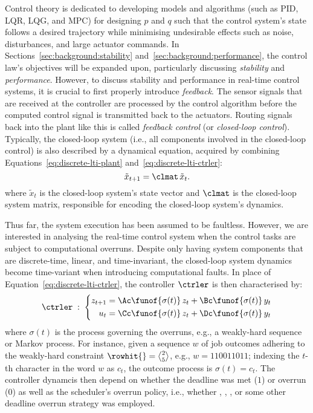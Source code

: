 Control theory is dedicated to developing models and algorithms (such as PID, LQR, LQG, and MPC) for designing $p$ and $q$ such that the control system's state follows a desired trajectory while minimising undesirable effects such as noise, disturbances, and large actuator commands.
In Sections~\ref{sec:background:stability} and~\ref{sec:background:performance}, the control law's objectives will be expanded upon, particularly discussing \emph{stability}  and \emph{performance}.
However, to discuss stability and performance in real-time control systems, it is crucial to first properly introduce \emph{feedback}.
The sensor signals that are received at the controller are processed by the control algorithm before the computed control signal is transmitted back to the actuators.
Routing signals back into the plant like this is called \emph{feedback control} (or \emph{closed-loop control}).
Typically, the closed-loop system (i.e., all components involved in the closed-loop control) is also described by a dynamical equation, acquired by combining Equations~\eqref{eq:discrete-lti-plant} and~\eqref{eq:discrete-lti-ctrler}:
%
\begin{equation}%
    \label{eq:clsys}%
    \tilde{x}_{t+1} = \clmat\, \tilde{x}_t.
\end{equation}
%
where $\tilde{x}_t$ is the closed-loop system's state vector and $\clmat$ is the closed-loop system matrix, responsible for encoding the closed-loop system's dynamics.

Thus far, the system execution has been assumed to be faultless.
However, we are interested in analysing the real-time control system when the control tasks are subject to computational overruns.
Despite only having system components that are discrete-time, linear, and time-invariant, the closed-loop system dynamics become time-variant when introducing computational faults.
In place of Equation~\eqref{eq:discrete-lti-ctrler}, the controller $\ctrler$ is then characterised by:
%
\begin{equation}%
    \label{eq:tv-ctrler}%
    \ctrler \; : \; \left\{\begin{aligned}
        z_{t+1} &= \Ac\funof{\sigma(t)}\,z_t + \Bc\funof{\sigma(t)}\,y_t \\
        u_t &= \Cc\funof{\sigma(t)}\,z_t + \Dc\funof{\sigma(t)}\,y_t \\
    \end{aligned}\right.
\end{equation}
%
where $\sigma(t)$ is the process governing the overruns, e.g., a weakly-hard sequence or Markov process.
For instance, given a sequence $w$ of job outcomes adhering to the weakly-hard constraint $\rowhit{} = \genfrac{<}{>}{0pt}{}{2}{5}$, e.g., $w = 110011011$; indexing the $t$-th character in the word $w$ as $c_t$, the outcome process is $\sigma(t) = c_t$.
The controller dynamcis then depend on whether the deadline was met ($1$) or overrun ($0$) as well as the scheduler's overrun policy, i.e., whether \tK{}, \tS{}, \tQ{}, or some other deadline overrun strategy was employed.

